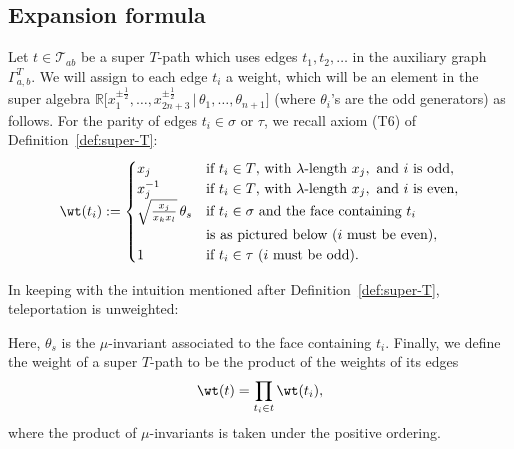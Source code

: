 \subsection{Expansion formula}

\begin{Definition}[weight] \label{def:weight}\rm
 Let $t \in \mathcal{T}_{ab}$ be a super $T$-path which uses edges $t_1,t_2,\dots$ in the auxiliary graph $\Gamma^T_{a,b}$.
 We will assign to each edge $t_i$ a weight, which will be an element in the super algebra
 $\mathbb R\bigl[x_1^{\pm\frac{1}{2}},\dots,x_{2n+3}^{\pm\frac{1}{2}} \,|\, \theta_1,\dots,\theta_{n+1}\bigr]$ (where $\theta_i$'s are the odd generators) as follows.
 For the parity of edges $t_i \in \sigma$ or $\tau$, we recall axiom (T6) of Definition~\ref{def:super-T}:
 \[
 \wt(t_i) := \begin{cases}
 x_j &\text{if } t_i \in T \text{, with }\lambda\text{-length }x_j, \text{ and }i \text{ is odd}, \\
 x_j^{-1} &\text{if } t_i \in T \text{, with }\lambda\text{-length }x_j, \text{ and }i \text{ is even}, \\
 \sqrt{\frac{x_j}{x_kx_l}} \, \theta_s &\text{if } t_i \in\sigma \text{ and the face containing }t_i \\
 & \text{is as pictured below} ~ (i \text{ must be even}), \\
 1&\text{if }t_i\in\tau~ (i \text{ must be odd}).
 \end{cases} \]

 In keeping with the intuition mentioned after Definition~\ref{def:super-T}, teleportation is unweighted:
 \begin{center}
 \end{center}
 Here, $\theta_s$ is the $\mu$-invariant associated to the face containing $t_i$.
	Finally, we define the weight of a super $T$-path to be the product of the weights of its edges
 \[\wt(t)=\prod_{t_i\in t}\wt(t_i),\]
 where the product of $\mu$-invariants is taken under the positive ordering.
\end{Definition}

